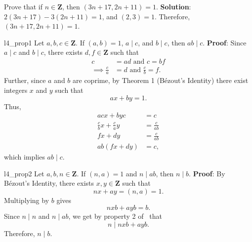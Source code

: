 \begin{Exercise}{}{}
    Prove that if $ n\in\mathbf{Z} $, then $ (3n+17,2n+11)=1 $.
    \tcblower{}
    \textbf{Solution}: $2(3n+17)-3(2n+11)=1$, and $ (2,3)=1 $. Therefore, $(3n+17,2n+11)=1$.
\end{Exercise}
\begin{Proposition}{}{l4_prop1}
    Let $ a,b,c\in\mathbf{Z} $. If $ (a,b)=1 $, $ a\mid c $, and $ b\mid c $,
    then $ ab\mid c $.
    \tcblower{}
    \textbf{Proof}: Since $ a\mid c $ and $ b\mid c $, there exists $ d,f\in\mathbf{Z} $ such that
    \begin{align*}
        c                    & =ad\text{ and }c           =bf \\
        \implies \frac{c}{a} & =d \text{ and }\frac{c}{b} =f.
    \end{align*}
    Further, since $a$ and $b$ are coprime, by Theorem 1 (Bézout's Identity) there exist
    integers $x$ and $y$ such that
    \[ ax+by=1. \]
    Thus,
    \begin{align*}
        acx+byc                   & =c            \\
        \frac{c}{b}x+\frac{c}{a}y & =\frac{c}{ab} \\
        fx+dy                     & =\frac{c}{ab} \\
        ab(fx+dy)                 & =c,
    \end{align*}
    which implies $ ab\mid c $.
\end{Proposition}
\begin{Proposition}{}{l4_prop2}
    Let $ a,b,n\in\mathbf{Z} $. If $ (n,a)=1 $ and $ n\mid ab $, then $ n\mid b $.
    \tcblower{}
    \textbf{Proof}: By Bézout's Identity, there exists $ x,y\in\mathbf{Z} $ such that
    \[ nx+ay=(n,a)=1. \]
    Multiplying by $b$ gives
    \[ nxb+ayb=b. \]
    Since $ n\mid n $ and $ n\mid ab $, we get by property 2 of~ that
    \[ n\mid nxb+ayb. \]
    Therefore, $ n\mid b $.
\end{Proposition}
